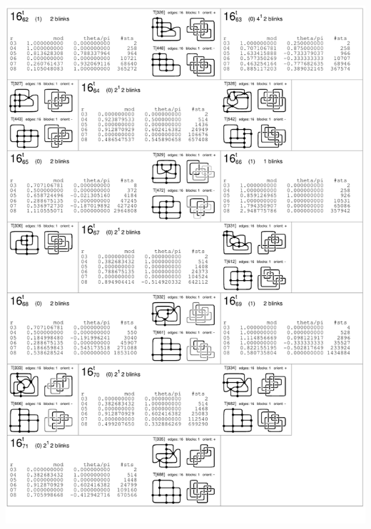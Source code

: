 \begin{center}
 \includegraphics[height=23.5cm]{E.figsbw2/con3catalog021_bw.pdf} \eject

\end{center}
